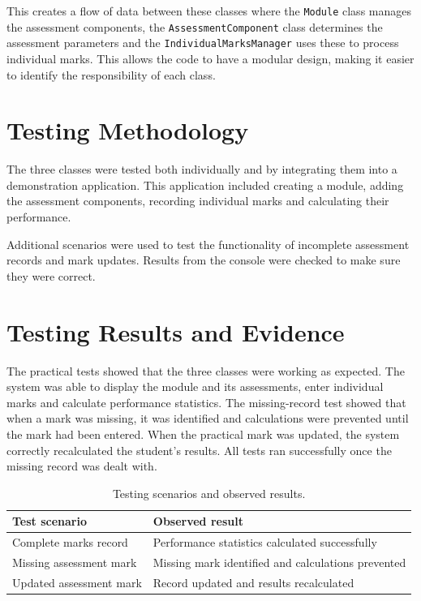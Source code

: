 This creates a flow of data between these classes where the \texttt{Module} class manages the assessment components, the \texttt{AssessmentComponent} class determines the assessment parameters and the \texttt{IndividualMarksManager} uses these to process individual marks. This allows the code to have a modular design, making it easier to identify the responsibility of each class.

\section{Testing Methodology}

The three classes were tested both individually and by integrating them into a demonstration application. This application included creating a module, adding the assessment components, recording individual marks and calculating their performance.

Additional scenarios were used to test the functionality of incomplete assessment records and mark updates. Results from the console were checked to make sure they were correct.

\section{Testing Results and Evidence}

The practical tests showed that the three classes were working as expected. The system was able to display the module and its assessments, enter individual marks and calculate performance statistics. The missing-record test showed that when a mark was missing, it was identified and calculations were prevented until the mark had been entered. When the practical mark was updated, the system correctly recalculated the student's results. All tests ran successfully once the missing record was dealt with.

\begin{table}[htbp]
    \centering
    \caption{Testing scenarios and observed results.}
    \label{tab:ch4-testing}
    \begin{tabular}{|p{}|p{}|}
        \hline
        \textbf{Test scenario} & \textbf{Observed result} \\
        \hline
        Complete marks record & Performance statistics calculated successfully \\
        \hline
        Missing assessment mark & Missing mark identified and calculations prevented \\
        \hline
        Updated assessment mark & Record updated and results recalculated \\
        \hline
    \end{tabular}
\end{table}

